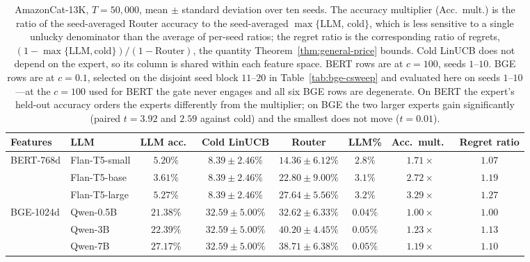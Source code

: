 \documentclass{article}
\theoremstyle{definition}
\theoremstyle{remark}
\theoremstyle{remark}
\begin{document}
\begin{table}[h]
\centering
\caption{AmazonCat-13K, $T=50{,}000$, mean $\pm$ standard deviation over ten
seeds. The accuracy multiplier (Acc.\ mult.) is the
ratio of the seed-averaged Router accuracy to the seed-averaged $\max\{$LLM,
cold$\}$, which is less sensitive to a single unlucky denominator than the
average of per-seed ratios; the regret ratio is the corresponding ratio of
regrets, $(1-\max\{\text{LLM},\text{cold}\})/(1-\text{Router})$, the quantity
Theorem~\ref{thm:general-price} bounds. Cold LinUCB does not depend on the expert, so its column is
shared within each feature space. BERT rows are at $c=100$, seeds $1$--$10$.
BGE rows are at $c=0.1$, selected on the disjoint seed block $11$--$20$ in
Table~\ref{tab:bge-csweep} and evaluated here on seeds $1$--$10$---at the
$c=100$ used for BERT the gate never engages and all six BGE rows are
degenerate. On BERT the expert's held-out accuracy orders the experts
differently from the multiplier; on BGE the two larger experts gain
significantly (paired $t=3.92$ and $2.59$ against cold) and the smallest does
not move ($t=0.01$).}
\label{tab:amazon-results}
\small
\begin{tabular}{@{}llcccccc@{}}
\toprule
Features & LLM & LLM acc.\ & Cold LinUCB & Router & LLM\% & Acc.\ mult.\ & Regret ratio \\
\midrule
\multirow{3}{*}{BERT-768d} & Flan-T5-small  & $5.20\%$ & $8.39\pm2.46\%$ & $14.36\pm6.12\%$ & $2.8\%$  & $1.71\times$ & $1.07$ \\
& Flan-T5-base  & $3.61\%$ & $8.39\pm2.46\%$ & $22.80\pm9.00\%$ & $3.1\%$  & $2.72\times$ & $1.19$ \\
& Flan-T5-large & $5.27\%$ & $8.39\pm2.46\%$ & $\mathbf{27.64\pm5.56\%}$ & $3.2\%$  & $\mathbf{3.29\times}$ & $\mathbf{1.27}$ \\
\midrule
\multirow{3}{*}{BGE-1024d} & Qwen-0.5B  & $21.38\%$ & $32.59\pm5.00\%$ & $32.62\pm6.33\%$ & $0.04\%$  & $1.00\times$ & $1.00$ \\
& Qwen-3B  & $22.39\%$ & $32.59\pm5.00\%$ & $\mathbf{40.20\pm4.45\%}$ & $0.05\%$  & $\mathbf{1.23\times}$ & $\mathbf{1.13}$ \\
& Qwen-7B  & $27.17\%$ & $32.59\pm5.00\%$ & $38.71\pm6.38\%$ & $0.05\%$  & $1.19\times$ & $1.10$ \\
\bottomrule
\end{tabular}
\end{table}
\end{document}
